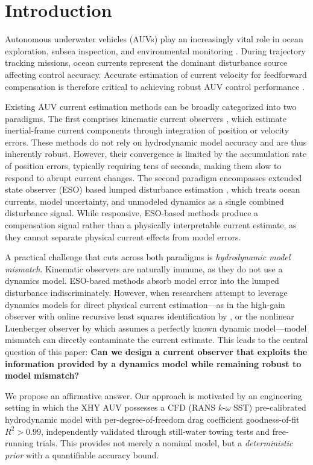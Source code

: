 \section{Introduction}

Autonomous underwater vehicles (AUVs) play an increasingly vital role in ocean exploration, subsea inspection, and environmental monitoring \cite{fossen2011handbook}. During trajectory tracking missions, ocean currents represent the dominant disturbance source affecting control accuracy. Accurate estimation of current velocity for feedforward compensation is therefore critical to achieving robust AUV control performance \cite{borhaug2007model}.

Existing AUV current estimation methods can be broadly categorized into two paradigms. The first comprises kinematic current observers \cite{liang2018three,he2024three}, which estimate inertial-frame current components through integration of position or velocity errors. These methods do not rely on hydrodynamic model accuracy and are thus inherently robust. However, their convergence is limited by the accumulation rate of position errors, typically requiring tens of seconds, making them slow to respond to abrupt current changes. The second paradigm encompasses extended state observer (ESO) based lumped disturbance estimation \cite{xie2020extended}, which treats ocean currents, model uncertainty, and unmodeled dynamics as a single combined disturbance signal. While responsive, ESO-based methods produce a compensation signal rather than a physically interpretable current estimate, as they cannot separate physical current effects from model errors.

A practical challenge that cuts across both paradigms is \emph{hydrodynamic model mismatch}. Kinematic observers are naturally immune, as they do not use a dynamics model. ESO-based methods absorb model error into the lumped disturbance indiscriminately. However, when researchers attempt to leverage dynamics models for direct physical current estimation---as in the high-gain observer with online recursive least squares identification by \cite{kim2018estimating}, or the nonlinear Luenberger observer by \cite{borhaug2007model} which assumes a perfectly known dynamic model---model mismatch can directly contaminate the current estimate. This leads to the central question of this paper: \textbf{Can we design a current observer that exploits the information provided by a dynamics model while remaining robust to model mismatch?}

We propose an affirmative answer. Our approach is motivated by an engineering setting in which the XHY AUV possesses a CFD (RANS $k$-$\omega$ SST) pre-calibrated hydrodynamic model with per-degree-of-freedom drag coefficient goodness-of-fit $R^2>0.99$, independently validated through still-water towing tests and free-running trials. This provides not merely a nominal model, but a \emph{deterministic prior} with a quantifiable accuracy bound.

